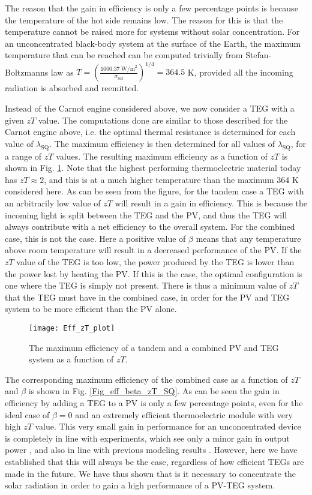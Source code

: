 \documentclass[fleqn,10pt]{SelfArx} %
\newcommand{\n}[1]{\mathrm{#1}}
\begin{document}
The reason that the gain in efficiency is only a few percentage points is because the temperature of the hot side remains low. The reason for this is that the temperature cannot be raised more for systems without solar concentration. For an unconcentrated black-body system at the surface of the Earth, the maximum temperature that can be reached can be computed trivially from Stefan-Boltzmanns law as $T=\left(\frac{1000.37\ \mathrm{W/m}^2}{\sigma_\n{SB}}\right)^{1/4}=364.5$ K, provided all the incoming radiation is absorbed and reemitted.

Instead of the Carnot engine considered above, we now consider a TEG with a given $zT$ value. The computations done are similar to those described for the Carnot engine above, i.e. the optimal thermal resistance is determined for each value of $\lambda_\n{SQ}$. The maximum efficiency is then determined for all values of $\lambda_\n{SQ}$, for a range of $zT$ values. The resulting maximum efficiency as a function of $zT$ is shown in Fig. \ref{Fig_Eff_zT_plot}. Note that the highest performing thermoelectric material today has $zT\approx2$, and this is at a much higher temperature than the maximum 364 K considered here. As can be seen from the figure, for the tandem case a TEG with an arbitrarily low value of $zT$ will result in a gain in efficiency. This is because the incoming light is split between the TEG and the PV, and thus the TEG will always contribute with a net efficiency to the overall system. For the combined case, this is not the case. Here a positive value of $\beta$ means that any temperature above room temperature will result in a decreased performance of the PV. If the $zT$ value of the TEG is too low, the power produced by the TEG is lower than the power lost by heating the PV. If this is the case, the optimal configuration is one where the TEG is simply not present. There is thus a minimum value of $zT$ that the TEG must have in the combined case, in order for the PV and TEG system to be more efficient than the PV alone.

\begin{figure}[!b]
  \centering
  \texttt{[image: Eff\_zT\_plot]}
  \caption{The maximum efficiency of a tandem and a combined PV and TEG system as a function of $zT$.}
  \label{Fig_Eff_zT_plot}
\end{figure}

The corresponding maximum efficiency of the combined case as a function of $zT$ and $\beta$ is shown in Fig. \ref{Fig_eff_beta_zT_SQ}. As can be seen the gain in efficiency by adding a TEG to a PV is only a few percentage points, even for the ideal case of $\beta=0$ and an extremely efficient thermoelectric module with very high $zT$ value. This very small gain in performance for an unconcentrated device is completely in line with experiments, which see only a minor gain in output power \cite{Mizoshiri_2012,Ju_2012}, and also in line with previous modeling results \cite{Bjoerk_2015b,Lorenzi_2015}. However, here we have established that this will always be the case, regardless of how efficient TEGs are made in the future. We have thus shown that is it necessary to concentrate the solar radiation \cite{Zhang_2014} in order to gain a high performance of a PV-TEG system.
\end{document}
